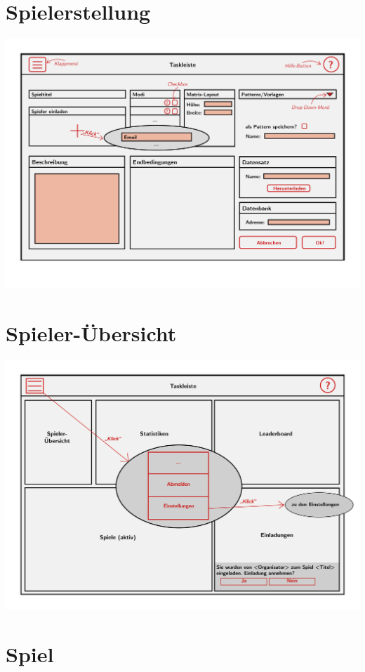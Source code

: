 \documentclass[a4paper]{scrreprt}
\begin{document}
    \section{Spielerstellung}
    \centering
    \includegraphics[width=\textwidth]{../pictures/Spielerstellung.jpg}

    \section{Spieler-Übersicht}
    \label{fig:Spieler-Übersicht}
    \centering
    \includegraphics[width=\textwidth]{../pictures/5_Spieler.jpg}

    \section{Spiel}
\end{document}

